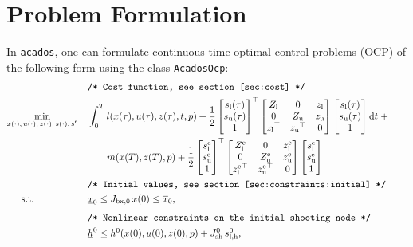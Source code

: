 \documentclass[english]{article}
\newcommand{\acados}{\texttt{acados}}
\newcommand{\tran}{^\top}
\newcommand{\ind}[1]{_{\textrm{#1}}}
\newcommand{\terminal}{^{\textrm{e}}}
\newcommand{\initial}{^{\textrm{0}}}
\newcommand{\matr}[1]{\begin{bmatrix}#1\end{bmatrix}}
\newcommand{\Lower}{\ind{l}}
\newcommand{\lowerh}{\ind{l,h}}
\newcommand{\upper}{\ind{u}}
\newcommand{\mathComment}[1]{\texttt{/* #1 */}}
\begin{document}
%
\section{Problem Formulation}\label{sec:problem}
%
In \acados{}, one can formulate continuous-time optimal control problems (OCP) of the following form using the class \texttt{AcadosOcp}:
%
\begin{align}
    &&&\mathComment{Cost function, see section \ref{sec:cost}}\nonumber\\
    &\underset{\begin{subarray}{c}
        x(\cdot),\,u(\cdot), \, z(\cdot), \, s(\cdot), \, s\terminal
        \end{subarray}}{\min}
    &&\int_0^T l(x(\tau), u(\tau), z(\tau), t, p)
     + \frac{1}{2} \matr{s\Lower(\tau) \\ s\upper(\tau) \\ 1} \tran
      \matr{ Z\Lower & 0 & z\Lower \\
      0 & Z\upper & z\upper \\
        {z\Lower}\tran & {z\upper}\tran & 0}
    \matr{s\Lower(\tau) \\ s\upper(\tau) \\ 1} \mathrm{d}t \; + \nonumber\\
     &&& \quad \quad m(x(T), z(T), p) +
      \frac{1}{2} \matr{s\Lower\terminal \\ s\upper\terminal \\ 1} \tran
     \matr{ Z\Lower\terminal & 0 & z\Lower\terminal \\
         0 & Z\upper\terminal & z\upper\terminal \\
         {z\Lower\terminal}\tran & {z\upper\terminal}\tran & 0}
     \matr{s\Lower\terminal \\ s\upper\terminal \\ 1}
     \label{eq:cost}\\
    &&&\mathComment{Initial values, see section \ref{sec:constraints:initial}}\nonumber\\
    &\,\,\,\quad \text{s.t.}    &&\underline{x}_0 \leq J_{\textrm{bx},0} \, x(0) \leq \overline{x}_0 , && \label{eq:constraints:initial}\\[1ex]
    &&&\mathComment{Nonlinear constraints on the initial shooting node} \nonumber\\
    &&&\underline{h}\initial \leq h\initial(x(0), u(0), z(0), p) + J_{\textrm{sh}}\initial \, s\lowerh\initial, &&\label{eq:constraints:path:lower_bounds:start}\\

\end{align}
\end{document}

